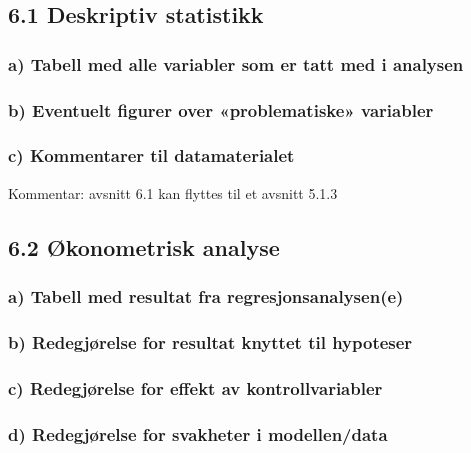 \documentclass[
  12pt,
  a4paper,
  DIV=11,
  numbers=noendperiod]{scrartcl}
\begin{document}
\subsection{6.1 Deskriptiv statistikk}\label{deskriptiv-statistikk}

\subsubsection{a) Tabell med alle variabler som er tatt med i
analysen}\label{a-tabell-med-alle-variabler-som-er-tatt-med-i-analysen}

\subsubsection{b) Eventuelt figurer over «problematiske»
variabler}\label{b-eventuelt-figurer-over-problematiske-variabler}

\subsubsection{c) Kommentarer til
datamaterialet}\label{c-kommentarer-til-datamaterialet}

Kommentar: avsnitt 6.1 kan flyttes til et avsnitt 5.1.3

\subsection{6.2 Økonometrisk analyse}\label{uxf8konometrisk-analyse}

\subsubsection{a) Tabell med resultat fra
regresjonsanalysen(e)}\label{a-tabell-med-resultat-fra-regresjonsanalysene}

\subsubsection{b) Redegjørelse for resultat knyttet til
hypoteser}\label{b-redegjuxf8relse-for-resultat-knyttet-til-hypoteser}

\subsubsection{c) Redegjørelse for effekt av
kontrollvariabler}\label{c-redegjuxf8relse-for-effekt-av-kontrollvariabler}

\subsubsection{d) Redegjørelse for svakheter i
modellen/data}\label{d-redegjuxf8relse-for-svakheter-i-modellendata}
\end{document}
